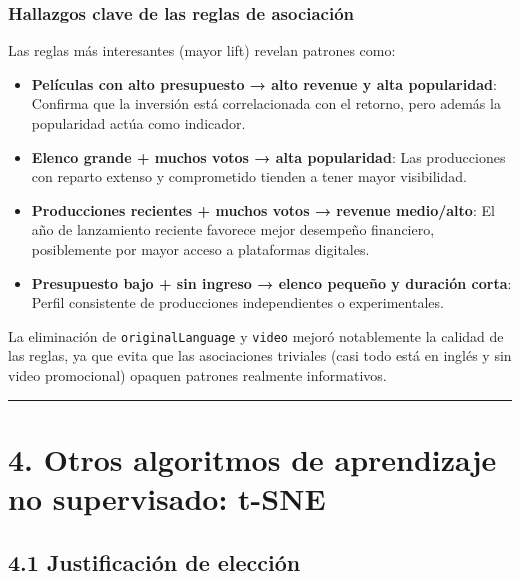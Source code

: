 \documentclass[
]{article}
\providecommand{\tightlist}{%
  \setlength{\itemsep}{0pt}\setlength{\parskip}{0pt}}
\begin{document}
\subsubsection{Hallazgos clave de las reglas de
asociación}\label{hallazgos-clave-de-las-reglas-de-asociaciuxf3n}

Las reglas más interesantes (mayor lift) revelan patrones como:

\begin{itemize}
\tightlist
\item
  \textbf{Películas con alto presupuesto → alto revenue y alta
  popularidad}: Confirma que la inversión está correlacionada con el
  retorno, pero además la popularidad actúa como indicador.\\
\item
  \textbf{Elenco grande + muchos votos → alta popularidad}: Las
  producciones con reparto extenso y comprometido tienden a tener mayor
  visibilidad.\\
\item
  \textbf{Producciones recientes + muchos votos → revenue medio/alto}:
  El año de lanzamiento reciente favorece mejor desempeño financiero,
  posiblemente por mayor acceso a plataformas digitales.\\
\item
  \textbf{Presupuesto bajo + sin ingreso → elenco pequeño y duración
  corta}: Perfil consistente de producciones independientes o
  experimentales.
\end{itemize}

La eliminación de \texttt{originalLanguage} y \texttt{video} mejoró
notablemente la calidad de las reglas, ya que evita que las asociaciones
triviales (casi todo está en inglés y sin video promocional) opaquen
patrones realmente informativos.

\begin{center}\rule{0.5\linewidth}{0.5pt}\end{center}

\section{4. Otros algoritmos de aprendizaje no supervisado:
t-SNE}\label{otros-algoritmos-de-aprendizaje-no-supervisado-t-sne}

\subsection{4.1 Justificación de
elección}\label{justificaciuxf3n-de-elecciuxf3n}
\end{document}
